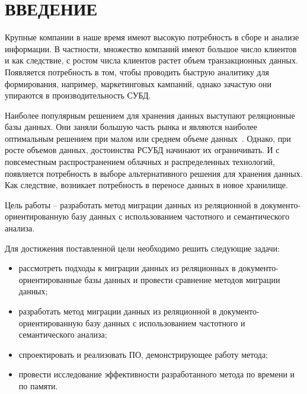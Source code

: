 \chapter*{ВВЕДЕНИЕ}

Крупные компании в наше время имеют высокую потребность в сборе
и анализе информации. В частности, множество компаний имеют большое
число клиентов и как следствие, с ростом числа клиентов растет объем
транзакционных данных. Появляется потребность в том, чтобы проводить
быструю аналитику для формирования, например, маркетинговых кампаний,
однако зачастую они упираются в производительность СУБД.

Наиболее популярным решением для хранения данных выступают реляционные базы данных. Они заняли большую часть рынка и являются наиболее
оптимальным решением при малом или среднем объеме данных~\cite{db_rating}. 
Однако, при росте объемов данных, достоинства РСУБД начинают их ограничивать.
И с повсеместным распространением облачных и распределенных технологий,
появляется потребность в выборе альтернативного решения для хранения данных.
Как следствие, возникает потребность в переносе данных в новое хранилище.


Цель работы – разработать метод миграции данных из реляционной в
документо-ориентированную базу данных с
использованием частотного и семантического
анализа.

Для достижения поставленной цели необходимо решить следующие
задачи:
\begin{itemize}[label=---]
    \item рассмотреть подходы к миграции данных из реляционных в документо-ориентированные
    базы данных и провести сравнение методов миграции данных;
    \item разработать метод миграции данных из реляционной в документо-ориентированную базу данных с
    использованием частотного и семантического анализа;
    \item спроектировать и реализовать ПО, демонстрирующее работу метода;
    \item провести исследование эффективности разработанного метода по времени и по памяти.
\end{itemize}

